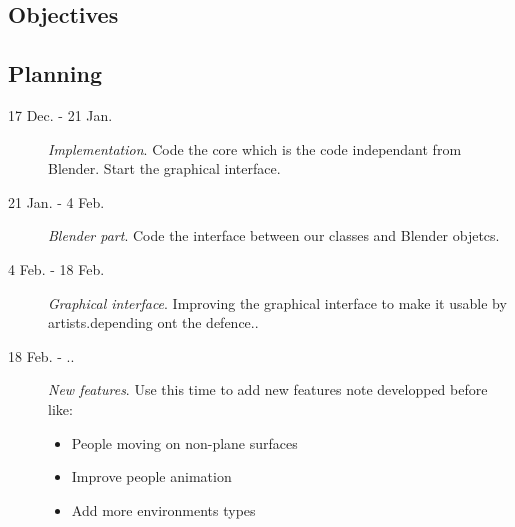 \documentclass[a4paper,11pt]{article}
\begin{document}
\subsection{Objectives}
\subsection{Planning}
\begin{description}
  \item[17 Dec. - 21 Jan.] \textit{Implementation}. Code the core which is the code independant from Blender. Start the graphical interface.
  \item[21 Jan. - 4 Feb.] \textit{Blender part}. Code the interface between our classes and Blender objetcs.
  \item[4 Feb. - 18 Feb.] \textit{Graphical interface}. Improving the graphical interface to make it usable by artists.depending ont the defence..
  \item[18 Feb. - ..] \textit{New features}.
Use this time to add new features note developped before like:
  \begin{itemize}
    \item People moving on non-plane surfaces
    \item Improve people animation
    \item Add more environments types
  \end{itemize}
\end{description}











\begingroup




\endgroup
\end{document}
